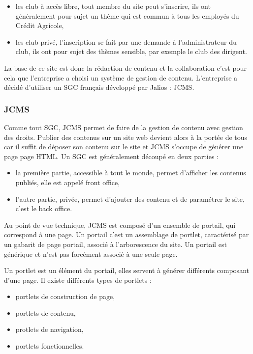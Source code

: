 \documentclass[12pt,a4paper]{article}
\begin{document}
\begin{itemize}
\item les club à accès libre, tout membre du site peut s'inscrire, ils ont généralement pour sujet un thème qui est commun à tous les employés du Crédit Agricole,
\item les club privé, l'inscription se fait par une demande à l'administrateur du club, ils ont pour sujet des thèmes sensible, par exemple le club des dirigent.
\end{itemize} \par 
\bigskip
La base de ce site est donc la rédaction de contenu et la collaboration c'est pour cela que l'entreprise a choisi un système de gestion de contenu. L'entreprise a décidé d'utiliser un SGC français développé par Jalios : \gls{JCMS}.

\subsubsection{JCMS}
Comme tout SGC, \gls{JCMS} permet de faire de la gestion de contenu avec gestion des droits. Publier des contenus sur un site web devient alors à la portée de tous car il suffit de déposer son contenu sur le site et \gls{JCMS} s'occupe de générer une page page HTML. Un SGC est généralement découpé en deux parties : 
\begin{itemize}
\item la première partie, accessible à tout le monde, permet d'afficher les contenus publiés, elle est appelé front office,
\item l'autre partie, privée, permet d'ajouter des contenu et de paramétrer le site, c'est le back office.
\end{itemize}\par
Au point de vue technique, \gls{JCMS} est composé d'un ensemble de portail, qui correspond à une page. Un portail c'est un assemblage de portlet, caractérisé par un gabarit de page portail, associé à l'arborescence du site. Un portail est générique et n'est pas forcément associé à une seule page.\par 
Un portlet est un élément du portail, elles servent à générer différents composant d'une page. Il existe différents types de portlets : 
\begin{itemize}
\item portlets de construction de page,
\item portlets de contenu,
\item protlets de navigation,
\item portlets fonctionnelles.
\end{itemize}
\end{document}
